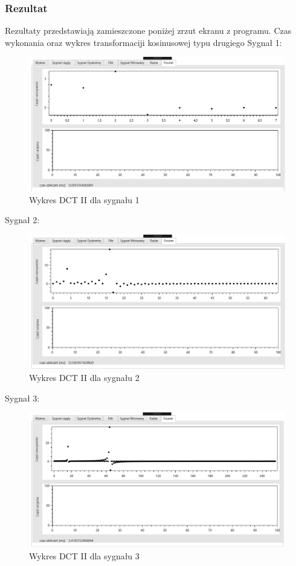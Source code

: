 \documentclass[12pt]{article}
\begin{document}
\subsubsection{Rezultat}

Rezultaty przedstawiają zamieszczone poniżej zrzut ekranu z programu. Czas wykonania oraz wykres transformaciji kosinusowej typu drugiego
\newpage
 Sygnał 1:
\begin{figure}[h!]
 \centering
 \includegraphics[width=12.3cm]{s13DCT2.PNG}
 \vspace{-0.3cm}
 \caption{Wykres DCT II dla sygnału 1}
 \label{Wykres dla wynikw eksperymentu pierwszego}
\end{figure}

Sygnał 2:
\begin{figure}[h!]
 \centering
 \includegraphics[width=12.3cm]{s16DCT2.PNG}
 \vspace{-0.3cm}
 \caption{Wykres DCT II dla sygnału 2}
 \label{Wykres dla wynikw eksperymentu pierwszego}
\end{figure}

\newpage
Sygnał 3:
\begin{figure}[h!]
 \centering
 \includegraphics[width=12.3cm]{s18DCT2.PNG}
 \vspace{-0.3cm}
 \caption{Wykres DCT II dla sygnału 3}
 \label{Wykres dla wynikw eksperymentu pierwszego}
\end{figure}
\end{document}
